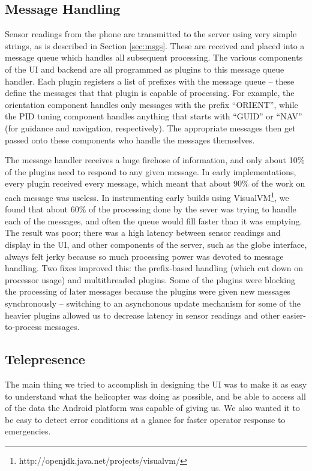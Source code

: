 \documentclass[letterpaper]{article}
\begin{document}
\subsection{Message Handling}
Sensor readings from the phone are transmitted to the server using
very simple strings, as is described in Section \ref{sec:msgs}. These
are received and placed into a message queue which handles all
subsequent processing. The various components of the UI and backend
are all programmed as plugins to this message queue handler. Each
plugin registers a list of prefixes with the message queue -- these
define the messages that that plugin is capable of processing. For
example, the orientation component handles only messages with the
prefix ``ORIENT'', while the PID tuning component handles anything
that starts with ``GUID'' or ``NAV'' (for guidance and navigation,
respectively). The appropriate messages then get passed onto these
components who handle the messages themselves.

The message handler receives a huge firehose of information, and only
about 10\% of the plugins need to respond to any given message. In
early implementations, every plugin received every message, which
meant that about 90\% of the work on each message was useless. In
instrumenting early builds using
VisualVM\footnote{http://openjdk.java.net/projects/visualvm/}, we
found that about 60\% of the processing done by the sever was trying
to handle each of the messages, and often the queue would fill faster
than it was emptying. The result was poor; there was a high latency
between sensor readings and display in the UI, and other components of
the server, such as the globe interface, always felt jerky because so
much processing power was devoted to message handling. Two fixes
improved this: the prefix-based handling (which cut down on processor
usage) and multithreaded plugins. Some of the plugins were blocking
the processing of later messages because the plugins were given new
messages synchronously -- switching to an asynchonous update mechanism
for some of the heavier plugins allowed us to decrease latency in
sensor readings and other easier-to-process messages.

\subsection{Telepresence}
The main thing we tried to accomplish in designing the UI was to make
it as easy to understand what the helicopter was doing as possible,
and be able to access all of the data the Android platform was capable
of giving us. We also wanted it to be easy to detect error conditions
at a glance for faster operator response to emergencies.
\end{document}
